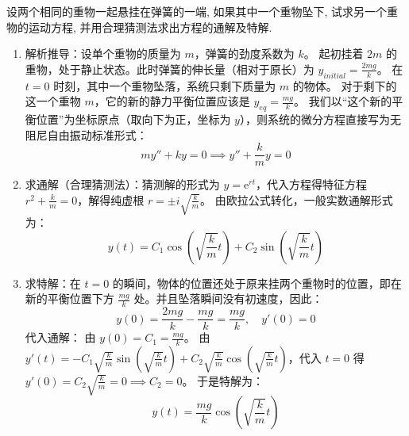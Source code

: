 \documentclass[lang=cn,11pt]{elegantbook}
\begin{document}
\begin{exercise}
设两个相同的重物一起悬挂在弹簧的一端, 如果其中一个重物坠下, 试求另一个重物的运动方程, 并用合理猜测法求出方程的通解及特解.
\end{exercise}
\begin{solution}
\begin{enumerate}
    \item 解析推导：设单个重物的质量为 $m$，弹簧的劲度系数为 $k$。
起初挂着 $2m$ 的重物，处于静止状态。此时弹簧的伸长量（相对于原长）为 $y_{initial} = \frac{2mg}{k}$。
在 $t=0$ 时刻，其中一个重物坠落，系统只剩下质量为 $m$ 的物体。
对于剩下的这一个重物 $m$，它的新的静力平衡位置应该是 $y_{eq} = \frac{mg}{k}$。
我们以“这个新的平衡位置”为坐标原点（取向下为正，坐标为 $y$），则系统的微分方程直接写为无阻尼自由振动标准形式：
\[
m y'' + ky = 0 \implies y'' + \frac{k}{m}y = 0
\]
\item 求通解（合理猜测法）：猜测解的形式为 $y = \mathrm{e}^{rt}$，代入方程得特征方程 $r^2 + \frac{k}{m} = 0$，解得纯虚根 $r = \pm i\sqrt{\frac{k}{m}}$。
由欧拉公式转化，一般实数通解形式为：
\[
y(t) = C_1\cos\left(\sqrt{\frac{k}{m}}t\right) + C_2\sin\left(\sqrt{\frac{k}{m}}t\right)
\]
\item 求特解：在 $t=0$ 的瞬间，物体的位置还处于原来挂两个重物时的位置，即在新的平衡位置下方 $\frac{mg}{k}$ 处。并且坠落瞬间没有初速度，因此：
\[
y(0) = \frac{2mg}{k} - \frac{mg}{k} = \frac{mg}{k}, \quad y'(0) = 0
\]
代入通解：
由 $y(0) = C_1 = \frac{mg}{k}$。
由 $y'(t) = -C_1\sqrt{\frac{k}{m}}\sin\left(\sqrt{\frac{k}{m}}t\right) + C_2\sqrt{\frac{k}{m}}\cos\left(\sqrt{\frac{k}{m}}t\right)$，代入 $t=0$ 得 $y'(0) = C_2\sqrt{\frac{k}{m}} = 0 \implies C_2=0$。
于是特解为：
\[
\boxed{y(t) = \frac{mg}{k}\cos\left(\sqrt{\frac{k}{m}}t\right)}
\]
\end{enumerate}
\end{solution}
\end{document}
